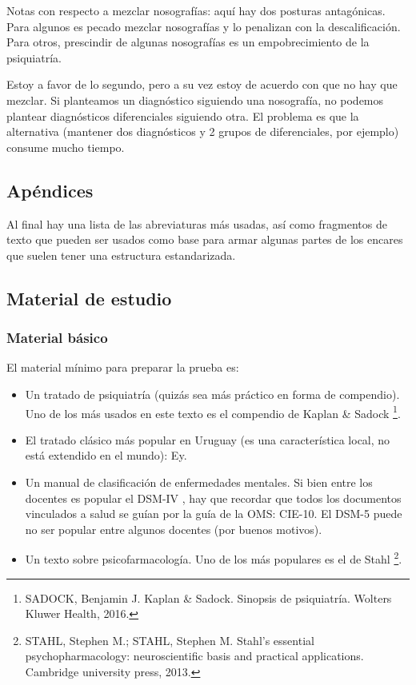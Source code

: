 Notas con respecto a mezclar nosografías: aquí hay dos posturas antagónicas. Para algunos es pecado mezclar nosografías y lo penalizan con la descalificación. Para otros, prescindir de algunas nosografías es un empobrecimiento de la psiquiatría.

Estoy a favor de lo segundo, pero a su vez estoy de acuerdo con que no hay que mezclar. Si planteamos un diagnóstico siguiendo una nosografía, no podemos plantear diagnósticos diferenciales siguiendo otra. El problema es que la alternativa (mantener dos diagnósticos y 2 grupos de diferenciales, por ejemplo) consume mucho tiempo.

\subsection*{Apéndices}

Al final hay una lista de las abreviaturas más usadas, así como fragmentos de texto que pueden ser usados como base para armar algunas partes de los encares que suelen tener una estructura estandarizada.

\subsection*{Material de estudio}
\subsubsection*{Material básico}

El material mínimo para preparar la prueba es:
\begin{itemize}
\item Un tratado de psiquiatría (quizás sea más práctico en forma de compendio). Uno de los más usados en este texto es el compendio de Kaplan \& Sadock \footnote{SADOCK, Benjamin J. Kaplan \& Sadock. Sinopsis de psiquiatría. Wolters Kluwer Health, 2016.}.
\item El tratado clásico más popular en Uruguay (es una característica local, no está extendido en el mundo): Ey\cite{ey1996}.
\item Un manual de clasificación de enfermedades mentales. Si bien entre los docentes es popular el DSM-IV \cite{dsmiv1998}, hay que recordar que todos los documentos vinculados a salud se guían por la guía de la OMS: CIE-10\cite{cie102000}. El DSM-5 puede no ser popular entre algunos docentes (por buenos motivos).
\item Un texto sobre psicofarmacología. Uno de los más populares es el de Stahl \footnote{STAHL, Stephen M.; STAHL, Stephen M. Stahl's essential psychopharmacology: neuroscientific basis and practical applications. Cambridge university press, 2013.}.
\end{itemize}
